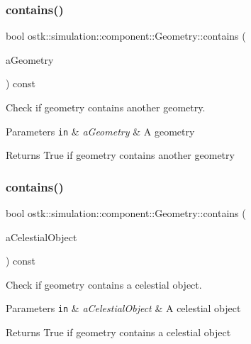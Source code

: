 \subsubsection{\texorpdfstring{contains()}{contains()}\hspace{0.1cm}{\footnotesize\ttfamily [1/2]}}
{\footnotesize\ttfamily bool ostk\+::simulation\+::component\+::\+Geometry\+::contains (\begin{DoxyParamCaption}\item[{const \hyperlink{namespaceostk_1_1simulation_1_1component_a911837ab7e6f8471e9927a74795a0077}{Object\+Geometry} \&}]{a\+Geometry }\end{DoxyParamCaption}) const}



Check if geometry contains another geometry. 


\begin{DoxyParams}[1]{Parameters}
\mbox{\tt in}  & {\em a\+Geometry} & A geometry \\
\hline
\end{DoxyParams}
\begin{DoxyReturn}{Returns}
True if geometry contains another geometry 
\end{DoxyReturn}
\mbox{\label{classostk_1_1simulation_1_1component_1_1_geometry_ade44921582930e30c598dbeba365f528}} 
\subsubsection{\texorpdfstring{contains()}{contains()}\hspace{0.1cm}{\footnotesize\ttfamily [2/2]}}
{\footnotesize\ttfamily bool ostk\+::simulation\+::component\+::\+Geometry\+::contains (\begin{DoxyParamCaption}\item[{const Celestial \&}]{a\+Celestial\+Object }\end{DoxyParamCaption}) const}



Check if geometry contains a celestial object. 


\begin{DoxyParams}[1]{Parameters}
\mbox{\tt in}  & {\em a\+Celestial\+Object} & A celestial object \\
\hline
\end{DoxyParams}
\begin{DoxyReturn}{Returns}
True if geometry contains a celestial object 
\end{DoxyReturn}
\mbox{\label{classostk_1_1simulation_1_1component_1_1_geometry_a39ea10b795b8732bafc20ee0fb9df962}} 

